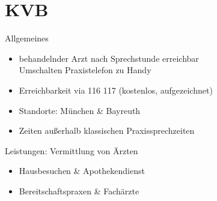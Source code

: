 \section{KVB}
\begin{sectionbox}{Allgemeines}
    \begin{itemize}
        \item behandelnder Arzt nach Sprechstunde erreichbar\\
        \ra Umschalten Praxistelefon zu Handy
        \item Erreichbarkeit via 116 117 (kostenlos, aufgezeichnet)
        \item Standorte: München \& Bayreuth
        \item Zeiten außerhalb klassischen Praxissprechzeiten
    \end{itemize}
\end{sectionbox}
\begin{sectionbox}{Leistungen: Vermittlung von Ärzten}
    \begin{itemize}
        \item Hausbesuchen  \& Apothekendienst
        \item Bereitschaftspraxen \& Fachärzte
    \end{itemize}
\end{sectionbox}